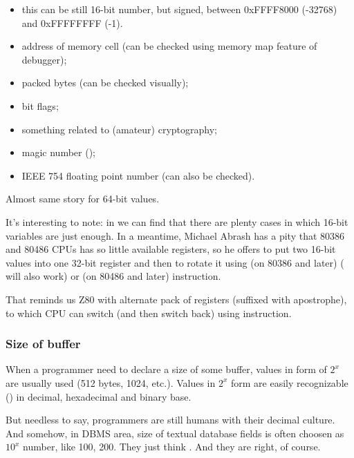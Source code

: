 \begin{itemize}

\item this can be still 16-bit number, but signed, between 0xFFFF8000 (-32768) and 0xFFFFFFFF (-1).
\item address of memory cell (can be checked using memory map feature of debugger);
\item packed bytes (can be checked visually);
\item bit flags;
\item something related to (amateur) cryptography;
\item magic number ();
\item IEEE 754 floating point number (can also be checked).

\end{itemize}

Almost same story for 64-bit values.


It's interesting to note: in 
we can find that there are plenty cases in which 16-bit variables are just enough.
In a meantime, Michael Abrash has a pity that 80386 and 80486 CPUs has so little available registers, so he offers to put
two 16-bit values into one 32-bit register and then to rotate it using
 (on 80386 and later) ( will also work) or 
 (on 80486 and later) instruction.

That reminds us Z80 with alternate pack of registers (suffixed with apostrophe), to which CPU can switch
(and then switch back) using  instruction.

\subsubsection{Size of buffer}

When a programmer need to declare a size of some buffer, values in form of $2^x$ are usually used (512 bytes, 1024, etc.).
Values in $2^x$ form are easily recognizable () in decimal, hexadecimal and binary base.

But needless to say, programmers are still humans with their decimal culture.
And somehow, in \ac{DBMS} area, size of textual database fields is often choosen as $10^x$ number, like 100, 200.
They just think .
And they are right, of course.

